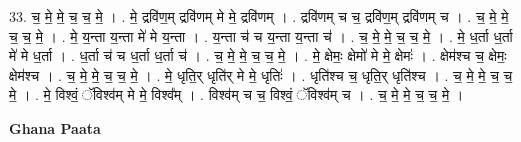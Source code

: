 \documentclass[17pt]{extarticle}
\begin{document}
33. च॒ मे॒ मे॒ च॒ च॒ मे॒ । . मे॒ द्रवि॑ण॒म् द्रवि॑णम् मे मे॒ द्रवि॑णम् । . द्रवि॑णम् च च॒ द्रवि॑ण॒म् द्रवि॑णम् च । . च॒ मे॒ मे॒ च॒ च॒ मे॒ । . मे॒ य॒न्ता य॒न्ता मे॑ मे य॒न्ता । . य॒न्ता च॑ च य॒न्ता य॒न्ता च॑ । . च॒ मे॒ मे॒ च॒ च॒ मे॒ । . मे॒ ध॒र्ता ध॒र्ता मे॑ मे ध॒र्ता । . ध॒र्ता च॑ च ध॒र्ता ध॒र्ता च॑ । . च॒ मे॒ मे॒ च॒ च॒ मे॒ । . मे॒ क्षेमः॒ क्षेमो॑ मे मे॒ क्षेमः॑ । . क्षेम॑श्च च॒ क्षेमः॒ क्षेम॑श्च । . च॒ मे॒ मे॒ च॒ च॒ मे॒ । . मे॒ धृति॒र् धृति॑र् मे मे॒ धृतिः॑ । . धृति॑श्च च॒ धृति॒र् धृति॑श्च । . च॒ मे॒ मे॒ च॒ च॒ मे॒ । . मे॒ विश्वं॒ ॅविश्व॑म् मे मे॒ विश्व᳚म् । . विश्व॑म् च च॒ विश्वं॒ ॅविश्व॑म् च । . च॒ मे॒ मे॒ च॒ च॒ मे॒ । \newline

\textbf{Ghana Paata } \newline
\end{document}
